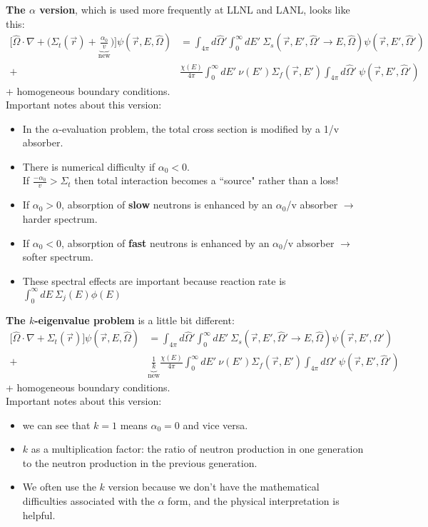 \documentclass[12pt]{article}
\newcommand{\vOmega}{\ensuremath{\hat{\Omega}}}
\begin{document}
\textbf{The $\alpha$ version}, which is used more frequently at LLNL and LANL, looks like this:
%
\begin{align*}
\bigl[\vOmega \cdot \nabla + \bigl(\Sigma_t(\vec{r}) + \underbrace{\frac{\alpha_0}{v}}_{\text{new}}\bigr)\bigr]
\psi(\vec{r}, E, \vOmega) &= \int_{4 \pi} d\vOmega'
\int_0^{\infty} dE' \: \Sigma_s(\vec{r}, E', \vOmega' \rightarrow E, \vOmega) \psi(\vec{r}, E', \vOmega')\\
 +& \frac{\chi(E)}{4 \pi}\int_0^{\infty} dE' \: \nu(E') \Sigma_f(\vec{r},E') \int_{4 \pi} d\vOmega' \:\psi(\vec{r}, E', \vOmega')
\end{align*}
+ homogeneous boundary conditions.\\
Important notes about this version:
%
\begin{itemize}
\item In the $\alpha$-evaluation problem, the total cross section is modified by a 1/v absorber.
\item There is numerical difficulty if $\alpha_0 < 0$.\\
If $\frac{-\alpha_0}{v} > \Sigma_t$ then total interaction becomes a ``source" rather than a loss!
\item If $\alpha_0 > 0$, absorption of \textbf{slow} neutrons is enhanced by an $\alpha_0$/v absorber $\rightarrow$ harder spectrum.
\item If $\alpha_0 < 0$, absorption of \textbf{fast} neutrons is enhanced by an $\alpha_0$/v absorber $\rightarrow$ softer spectrum.
\item These spectral effects are important because reaction rate is $\int_0^{\infty} dE \:\Sigma_j(E) \phi(E)$
\end{itemize}
\pagebreak
\textbf{The $k$-eigenvalue problem} is a little bit different:
%
\begin{align*}
\bigl[\vOmega \cdot \nabla + \Sigma_t(\vec{r}) \bigr]\psi(\vec{r}, E, \vOmega) &= 
\int_{4 \pi} d\vOmega' \int_0^{\infty} dE' \: \Sigma_s(\vec{r}, E', \vOmega' \rightarrow E, \vOmega)
\psi(\vec{r}, E', \vOmega')\\
 +& \underbrace{\frac{1}{k}}_{\text{new}}\frac{\chi(E)}{4 \pi}\int_0^{\infty} dE' \: \nu(E') \Sigma_f(\vec{r},E')
 \int_{4 \pi} d\vOmega' \:\psi(\vec{r}, E', \vOmega')
\end{align*}
%
+ homogeneous boundary conditions.\\
Important notes about this version:
\begin{itemize}
\item we can see that $k=1$ means $\alpha_0 = 0$ and vice versa.
\item $k$ as a multiplication factor: the ratio of neutron production in one generation to the neutron production in the previous generation.
\item We often use the $k$ version because we don't have the mathematical difficulties associated with the $\alpha$ form, and the physical interpretation is helpful.
\end{itemize}
\end{document}
